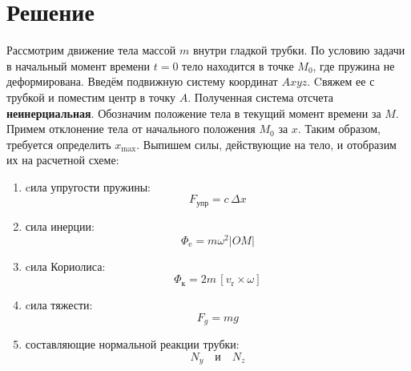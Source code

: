 \documentclass{article}
\begin{document}
\section*{Решение}

Рассмотрим движение тела массой $m$ внутри гладкой трубки. По условию задачи в начальный момент времени $t = 0$ тело находится в точке $M_0$, где пружина не деформирована. Введём подвижную систему координат $Axyz$. Cвяжем ее с трубкой и поместим центр в точку $A$. Полученная система отсчета \textbf{неинерциальная}. Обозначим положение тела в текущий момент времени за $M$. Примем отклонение тела от начального положения $M_0$ за $x$. Таким образом, требуется определить $x_\text{max}$. Выпишем силы, действующие на тело, и отобразим их на расчетной схеме:
	
	\begin{enumerate}
		\item cила упругости пружины:
		\[
		{F}_{\text{упр}} = c\,\Delta x
		\]
		\item сила инерции:
		\[
		{\Phi}_{\text{e}} = m\omega^2 |OM|
		\]
		\item cила Кориолиса:
		\[
		{\Phi}_{\text{к}} = 2m\,[{v}_{\text{r}} \times {\omega}]
		\]
		\item cила тяжести:
		\[
		{F}_g = mg
		\]
		\item составляющие нормальной реакции трубки:
		\[
		N_y \quad \text{и} \quad N_z
		\]
	\end{enumerate}
	
\end{document}
